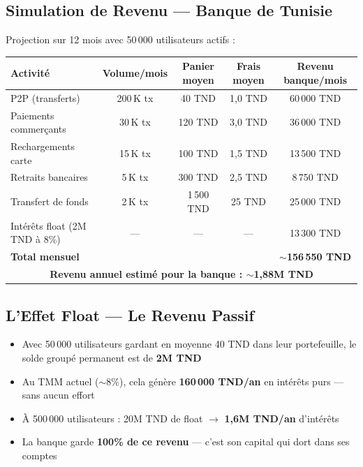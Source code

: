 \documentclass[11pt,a4paper]{article}
\begin{document}
\subsection{Simulation de Revenu --- Banque de Tunisie}

Projection sur 12 mois avec 50\,000 utilisateurs actifs :

\begin{center}
\begin{tabular}{|l|c|c|c|c|}
\hline
\textbf{Activit\'e} & \textbf{Volume/mois} & \textbf{Panier moyen} & \textbf{Frais moyen} & \textbf{Revenu banque/mois} \\
\hline
P2P (transferts)    & 200\,K tx  & 40 TND  & 1,0 TND  & 60\,000 TND \\
Paiements commer\c{c}ants & 30\,K tx & 120 TND & 3,0 TND  & 36\,000 TND \\
Rechargements carte & 15\,K tx  & 100 TND & 1,5 TND  & 13\,500 TND \\
Retraits bancaires   & 5\,K tx   & 300 TND & 2,5 TND  & 8\,750 TND \\
Transfert de fonds   & 2\,K tx   & 1\,500 TND & 25 TND  & 25\,000 TND \\
Int\'er\^ets float (2M TND \`a 8\%) & --- & --- & --- & 13\,300 TND \\
\hline
\textbf{Total mensuel} & & & & \textbf{$\sim$156\,550 TND} \\
\hline
\multicolumn{5}{|c|}{\textbf{Revenu annuel estim\'e pour la banque : $\sim$1,88M TND}} \\
\hline
\end{tabular}
\end{center}

\subsection{L'Effet Float --- Le Revenu Passif}

\begin{itemize}[leftmargin=*]
    \item Avec 50\,000 utilisateurs gardant en moyenne 40 TND dans leur portefeuille, le solde group\'e permanent est de \textbf{2M TND}
    \item Au TMM actuel ($\sim$8\%), cela g\'en\`ere \textbf{160\,000 TND/an} en int\'er\^ets purs --- sans aucun effort
    \item \`A 500\,000 utilisateurs : 20M TND de float $\rightarrow$ \textbf{1,6M TND/an} d'int\'er\^ets
    \item La banque garde \textbf{100\% de ce revenu} --- c'est son capital qui dort dans ses comptes
\end{itemize}
\end{document}
